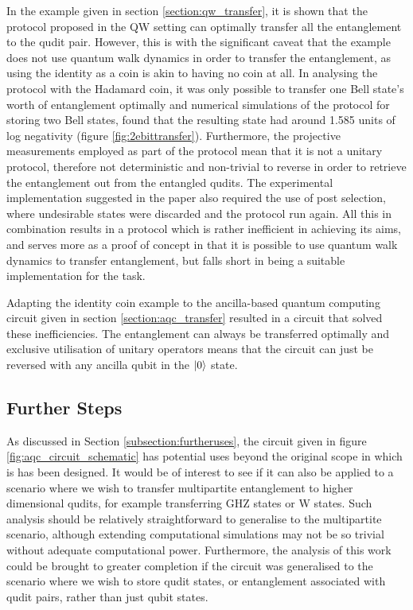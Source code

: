 In the example given in section \ref{section:qw_transfer}, it is shown that the protocol proposed in the QW setting can optimally transfer all the entanglement to the qudit pair.
However, this is with the significant caveat that the example does not use quantum walk dynamics in order to transfer the entanglement, as using the identity as a coin is akin to having no coin at all.
In analysing the protocol with the Hadamard coin, it was only possible to transfer one Bell state's worth of entanglement optimally and
numerical simulations of the protocol for storing two Bell states, found that the resulting state had around 1.585 units of log negativity (figure \ref{fig:2ebittransfer}).
Furthermore, the projective measurements employed as part of the protocol mean that it is not a unitary protocol, therefore not deterministic and non-trivial to reverse in order to retrieve the entanglement out from the entangled qudits.
The experimental implementation suggested in the paper also required the use of post selection, where undesirable states were discarded and the protocol run again.
All this in combination results in a protocol which is rather inefficient in achieving its aims, and serves more as a proof of concept in that it is possible to use quantum walk dynamics to transfer entanglement, but falls short in being a suitable implementation for the task.

Adapting the identity coin example to the ancilla-based quantum computing circuit given in section \ref{section:aqc_transfer} resulted in a circuit that solved these inefficiencies.
The entanglement can always be transferred optimally and exclusive utilisation of unitary operators means that the circuit can just be reversed with any ancilla qubit in the $\ket{0}$ state.

\subsection{Further Steps}
\label{subsection:furthersteps}
As discussed in Section \ref{subsection:furtheruses}, the circuit given in figure \ref{fig:aqc_circuit_schematic} has potential uses beyond the original scope in which is has been designed.
It would be of interest to see if it can also be applied to a scenario where we wish to transfer multipartite entanglement to higher dimensional qudits, for example transferring GHZ states or W states.
Such analysis should be relatively straightforward to generalise to the multipartite scenario, although extending computational simulations may not be so trivial without adequate computational power.
Furthermore, the analysis of this work could be brought to greater completion if the circuit was generalised to the scenario where we wish to store qudit states, or entanglement associated with qudit pairs, rather than just qubit states.